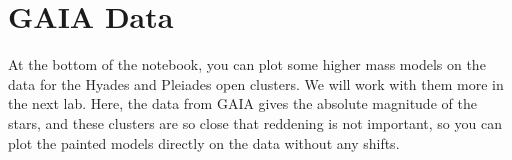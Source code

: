 \documentclass{article}
\begin{document}
\section{GAIA Data}

At the bottom of the notebook, you can plot some higher mass models on the data for the Hyades and Pleiades open clusters.  We will work with them more in the next lab. Here, the data from GAIA gives the absolute magnitude of the stars, and these clusters are so close that reddening is not important, so you can plot the painted models directly on the data without any shifts.
\end{document}

